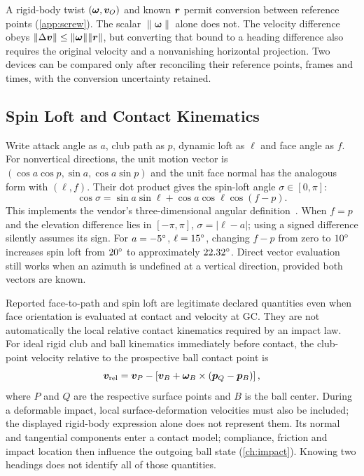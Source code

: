 \begin{keypoint}
A rigid-body twist $(\boldsymbol\omega,\bm{v}_O)$ and known $\bm{r}$ permit conversion between reference points (\cref{app:screw}).
The scalar $\|\boldsymbol\omega\|$ alone does not.
The velocity difference obeys $\|\Delta\bm{v}\|\leq\|\boldsymbol\omega\|\|\bm{r}\|$, but converting that bound to a heading difference also requires the original velocity and a nonvanishing horizontal projection.
Two devices can be compared only after reconciling their reference points, frames and times, with the conversion uncertainty retained.
\end{keypoint}

\subsection{Spin Loft and Contact Kinematics}

Write attack angle as $a$, club path as $p$, dynamic loft as $\ell$ and face angle as $f$.
For nonvertical directions, the unit motion vector is $(\cos a\cos p,\sin a,\cos a\sin p)$ and the unit face normal has the analogous form with $(\ell,f)$.
Their dot product gives the spin-loft angle $\sigma\in[0,\pi]$:
\begin{equation}
\label{eq:parametersspinloft}
\cos\sigma=\sin a\sin\ell+\cos a\cos\ell\cos(f-p).
\end{equation}
This implements the vendor's three-dimensional angular definition~\cite{trackmanspinloft}.
When $f=p$ and the elevation difference lies in $[-\pi,\pi]$, $\sigma=|\ell-a|$; using a signed difference silently assumes its sign.
For $a=-5\si{\degree}$, $\ell=15\si{\degree}$, changing $f-p$ from zero to $10\si{\degree}$ increases spin loft from $20\si{\degree}$ to approximately $22.32\si{\degree}$.
Direct vector evaluation still works when an azimuth is undefined at a vertical direction, provided both vectors are known.

Reported face-to-path and spin loft are legitimate declared quantities even when face orientation is evaluated at contact and velocity at GC.
They are not automatically the local relative contact kinematics required by an impact law.
For ideal rigid club and ball kinematics immediately before contact, the club-point velocity relative to the prospective ball contact point is
\begin{equation}
\bm{v}_{\rm rel}=\bm{v}_P-
 \left[\bm{v}_B+\boldsymbol\omega_B\times(\bm{p}_Q-\bm{p}_B)\right],
\end{equation}
where $P$ and $Q$ are the respective surface points and $B$ is the ball center.
During a deformable impact, local surface-deformation velocities must also be included; the displayed rigid-body expression alone does not represent them.
Its normal and tangential components enter a contact model; compliance, friction and impact location then influence the outgoing ball state (\cref{ch:impact}).
Knowing two headings does not identify all of those quantities.

